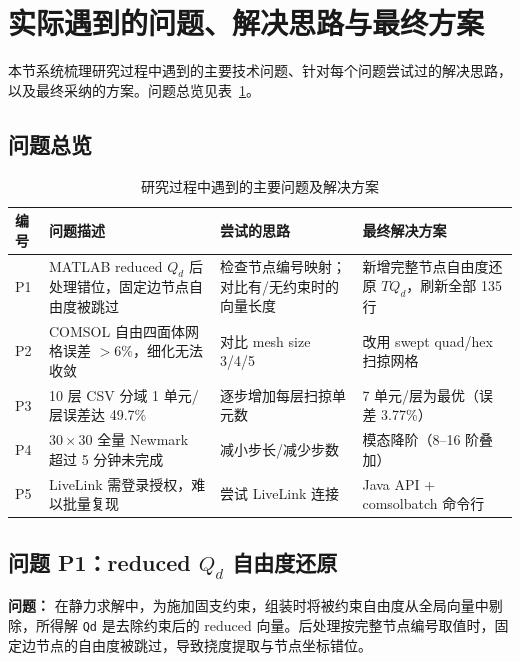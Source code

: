 \documentclass[11pt,a4paper]{ctexart}
\begin{document}
\section{实际遇到的问题、解决思路与最终方案}

本节系统梳理研究过程中遇到的主要技术问题、针对每个问题尝试过的解决思路，以及最终采纳的方案。问题总览见表~\ref{tab:problems}。

\subsection{问题总览}

\begin{table}[H]
\centering
\caption{研究过程中遇到的主要问题及解决方案}
\label{tab:problems}
\small
\begin{tabularx}{\textwidth}{>{\centering\arraybackslash}p{0.6cm}|p{3.0cm}|p{3.4cm}|X}
\toprule
\textbf{编号} & \textbf{问题描述} & \textbf{尝试的思路} & \textbf{最终解决方案} \\
\midrule
P1 & MATLAB reduced $Q_d$ 后处理错位，固定边节点自由度被跳过 & 检查节点编号映射；对比有/无约束时的向量长度 & 新增完整节点自由度还原 $TQ_d$，刷新全部 135 行 \\
\midrule
P2 & COMSOL 自由四面体网格误差 $>6\%$，细化无法收敛 & 对比 mesh size 3/4/5 & 改用 swept quad/hex 扫掠网格 \\
\midrule
P3 & 10 层 CSV 分域 1 单元/层误差达 49.7\% & 逐步增加每层扫掠单元数 & 7 单元/层为最优（误差 3.77\%） \\
\midrule
P4 & $30\times30$ 全量 Newmark 超过 5 分钟未完成 & 减小步长/减少步数 & 模态降阶（8--16 阶叠加） \\
\midrule
P5 & LiveLink 需登录授权，难以批量复现 & 尝试 LiveLink 连接 & Java API + comsolbatch 命令行 \\
\bottomrule
\end{tabularx}
\end{table}

\subsection{问题 P1：reduced $Q_d$ 自由度还原}

\textbf{问题：} 在静力求解中，为施加固支约束，组装时将被约束自由度从全局向量中剔除，所得解 \texttt{Qd} 是去除约束后的 reduced 向量。后处理按完整节点编号取值时，固定边节点的自由度被跳过，导致挠度提取与节点坐标错位。
\end{document}
